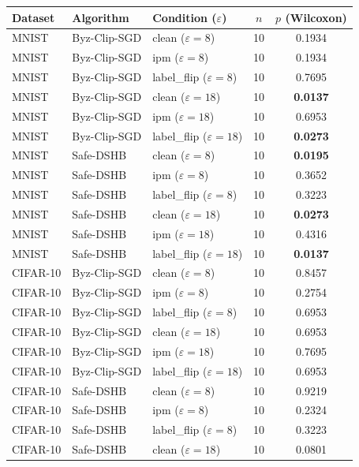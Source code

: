 \documentclass{article}
\begin{document}
\begin{table}[t]
\centering\footnotesize
\begin{tabular}{lllcc}
\toprule
Dataset & Algorithm & Condition ($\varepsilon$) & $n$ & $p$ (Wilcoxon) \\
\midrule
MNIST & Byz-Clip-SGD & clean ($\varepsilon{=}8$) & 10 & 0.1934 \\
MNIST & Byz-Clip-SGD & ipm ($\varepsilon{=}8$) & 10 & 0.1934 \\
MNIST & Byz-Clip-SGD & label\_flip ($\varepsilon{=}8$) & 10 & 0.7695 \\
MNIST & Byz-Clip-SGD & clean ($\varepsilon{=}18$) & 10 & \textbf{0.0137} \\
MNIST & Byz-Clip-SGD & ipm ($\varepsilon{=}18$) & 10 & 0.6953 \\
MNIST & Byz-Clip-SGD & label\_flip ($\varepsilon{=}18$) & 10 & \textbf{0.0273} \\
MNIST & Safe-DSHB & clean ($\varepsilon{=}8$) & 10 & \textbf{0.0195} \\
MNIST & Safe-DSHB & ipm ($\varepsilon{=}8$) & 10 & 0.3652 \\
MNIST & Safe-DSHB & label\_flip ($\varepsilon{=}8$) & 10 & 0.3223 \\
MNIST & Safe-DSHB & clean ($\varepsilon{=}18$) & 10 & \textbf{0.0273} \\
MNIST & Safe-DSHB & ipm ($\varepsilon{=}18$) & 10 & 0.4316 \\
MNIST & Safe-DSHB & label\_flip ($\varepsilon{=}18$) & 10 & \textbf{0.0137} \\
CIFAR-10 & Byz-Clip-SGD & clean ($\varepsilon{=}8$) & 10 & 0.8457 \\
CIFAR-10 & Byz-Clip-SGD & ipm ($\varepsilon{=}8$) & 10 & 0.2754 \\
CIFAR-10 & Byz-Clip-SGD & label\_flip ($\varepsilon{=}8$) & 10 & 0.6953 \\
CIFAR-10 & Byz-Clip-SGD & clean ($\varepsilon{=}18$) & 10 & 0.6953 \\
CIFAR-10 & Byz-Clip-SGD & ipm ($\varepsilon{=}18$) & 10 & 0.7695 \\
CIFAR-10 & Byz-Clip-SGD & label\_flip ($\varepsilon{=}18$) & 10 & 0.6953 \\
CIFAR-10 & Safe-DSHB & clean ($\varepsilon{=}8$) & 10 & 0.9219 \\
CIFAR-10 & Safe-DSHB & ipm ($\varepsilon{=}8$) & 10 & 0.2324 \\
CIFAR-10 & Safe-DSHB & label\_flip ($\varepsilon{=}8$) & 10 & 0.3223 \\
CIFAR-10 & Safe-DSHB & clean ($\varepsilon{=}18$) & 10 & 0.0801 \\

\end{tabular}
\end{table}
\end{document}
